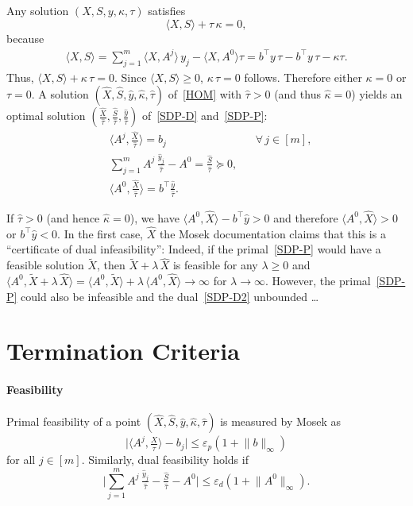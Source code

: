 \documentclass[10pt, a4paper]{article}
\newcommand{\abs}[1]{\lvert{#1}\rvert}
\newcommand{\norm}[1]{\lVert{#1}\rVert}
\newcommand{\skal}[2]{\langle{#1},{#2}\rangle}
\newcommand{\T}{^{\top}}
\begin{document}
Any solution $(X,S,y,\kappa,\tau)$ satisfies
\[
\skal{X}{S} + \tau\, \kappa = 0,
\]
because
\begin{align*}
  \skal{X}{S} = \sum_{j=1}^m \skal{X}{A^j}\, y_j - \skal{X}{A^0} \tau = b\T y\,\tau - b\T y\,\tau - \kappa \tau.
\end{align*}
Thus, $\skal{X}{S} + \kappa\, \tau = 0$. Since $\skal{X}{S} \geq 0$,
$\kappa \, \tau = 0$ follows. Therefore either $\kappa = 0$ or $\tau = 0$.
A solution $(\hat{X},\hat{S},\hat{y},\hat{\kappa},\hat{\tau})$
of~\eqref{HOM} with $\hat{\tau} > 0$ (and thus $\hat{\kappa} = 0$) yields
an optimal solution
$(\frac{\hat{X}}{\hat{\tau}}, \frac{\hat{S}}{\hat{\tau}},
\frac{\hat{y}}{\hat{\tau}})$ of~\eqref{SDP-D} and~\eqref{SDP-P}:
\begin{align*}
  & \skal{A^j}{\tfrac{\hat{X}}{\hat{\tau}}} = b_j && \forall \, j \in [m],\\
  & \sum_{j=1}^m A^j\, \tfrac{\hat{y}_j}{\hat{\tau}} -
    A^0 = \tfrac{\hat{S}}{\hat{\tau}} \succeq 0, \\
  & \skal{A^0}{\tfrac{\hat{X}}{\hat{\tau}}} = b\T \tfrac{\hat{y}}{\hat{\tau}}.
\end{align*}

If $\hat{\tau} > 0$ (and hence $\hat{\kappa} = 0$), we have
$\skal{A^0}{\hat{X}} - b\T \hat{y} > 0$ and therefore
$\skal{A^0}{\hat{X}} > 0$ or $b\T \hat{y} < 0$. In the first case,
$\hat{X}$ the Mosek documentation claims that this is a ``certificate of
dual infeasibility'': Indeed, if the primal~\eqref{SDP-P} would have a
feasible solution $\tilde{X}$, then $\tilde{X} + \lambda\, \hat{X}$ is
feasible for any $\lambda \geq 0$ and
$\skal{A^0}{\tilde{X} + \lambda\, \hat{X}} = \skal{A^0}{\tilde{X}} +
\lambda\, \skal{A^0}{\hat{X}} \to \infty$
for $\lambda \to \infty$. However, the primal~\eqref{SDP-P} could also be
infeasible and the dual~\eqref{SDP-D2} unbounded \dots




\section{Termination Criteria}

\paragraph{Feasibility}

Primal feasibility of a point
$(\hat{X},\hat{S},\hat{y},\hat{\kappa},\hat{\tau})$ is measured by Mosek as
\[
\abs{\skal{A^j}{\tfrac{\hat{X}}{\hat{\tau}}} - b_j}
\leq \varepsilon_p (1 + \norm{b}_\infty)
\]
for all $j \in [m]$. Similarly, dual feasibility holds if
\[
\Big\lvert\sum_{j=1}^m A^j\, \tfrac{\hat{y}_j}{\hat{\tau}} - \tfrac{\hat{S}}{\hat{\tau}} - A^0\Big\rvert
\leq \varepsilon_d (1 + \norm{A^0}_\infty).
\]
\end{document}
